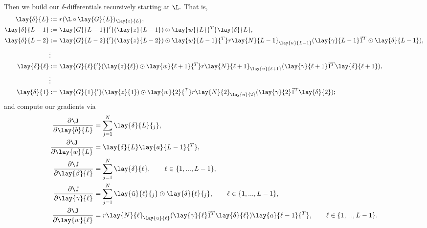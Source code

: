 Then we build our $\delta$-differentials recursively starting at $\L$.  That is,
\begin{align*}
	\lay{\delta}{L}&:=r(\L\circ\lay{G}{L})_{\lay{z}{L}},\\
	\lay{\delta}{L-1}&:=\lay{G}{L-1}{'}(\lay{z}{L-1})\odot\lay{w}{L}{^T}\lay{\delta}{L},\\
	\lay{\delta}{L-2}&:=\lay{G}{L-2}{'}(\lay{z}{L-2})\odot\lay{w}{L-1}{^T}r\lay{N}{L-1}_{\lay{u}{L-1}}(\lay{\gamma}{L-1}\vec{1}^T\odot\lay{\delta}{L-1}),\\
	&\vdots\\
	\lay{\delta}{\ell}&:=\lay{G}{\ell}{'}(\lay{z}{\ell})\odot\lay{w}{\ell+1}{^T}r\lay{N}{\ell+1}_{\lay{u}{\ell+1}}(\lay{\gamma}{\ell+1}\vec{1}^T\lay{\delta}{\ell+1}),\\
	&\vdots\\
	\lay{\delta}{1}&:=\lay{G}{1}{'}(\lay{z}{1})\odot\lay{w}{2}{^T}r\lay{N}{2}_{\lay{u}{2}}(\lay{\gamma}{2}\vec{1}^T\lay{\delta}{2});
\end{align*}
and compute our gradients via
\begin{align*}
	\frac{\partial\J}{\partial\lay{b}{L}}&=\sum_{j=1}^N\lay{\delta}{L}{_j},\\
	\frac{\partial\J}{\partial\lay{w}{L}}&=\lay{\delta}{L}\lay{a}{L-1}{^T},\\
	\frac{\partial\J}{\partial\lay{\beta}{\ell}}&=\sum_{j=1}^N\lay{\delta}{\ell},\qquad\ell\in\{1,...,L-1\},\\
	\frac{\partial\J}{\partial\lay{\gamma}{\ell}}&=\sum_{j=1}^N\lay{\hat{u}}{\ell}{_j}\odot\lay{\delta}{\ell}{_j},\qquad\ell\in\{1,...,L-1\},\\
	\frac{\partial\J}{\partial\lay{w}{\ell}}&=r\lay{N}{\ell}_{\lay{u}{\ell}}(\lay{\gamma}{\ell}\vec{1}^T\lay{\delta}{\ell})\lay{a}{\ell-1}{^T},\qquad\ell\in\{1,...,L-1\}.
\end{align*}







